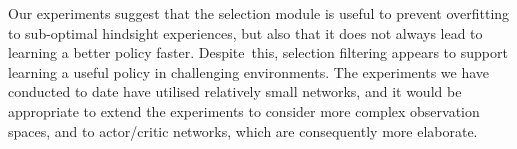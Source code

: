 Our experiments suggest that the selection module is useful to prevent overfitting to sub-optimal hindsight experiences, but also that it does not always lead to learning a better policy faster. Despite~this, selection filtering appears to support learning a useful policy in challenging environments. The experiments we have conducted to date have utilised relatively small networks, and it would be appropriate to extend the experiments to consider more complex observation spaces, and to actor/critic networks, which are consequently more elaborate.

